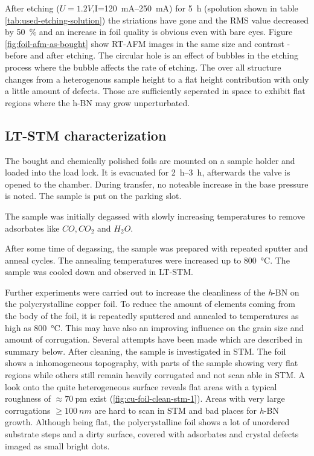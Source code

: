 	After etching ($U=1.2V$,I=\SIrange{120}{250}{\mA}) for \SI{5}{\hour} (spolution shown in table \ref{tab:used-etching-solution}) the striations have gone and the RMS value decreased by \SI{50}{\percent} and an increase in foil quality is obvious even with bare eyes. Figure \ref{fig:foil-afm-as-bought} show RT-AFM images in the same size and contrast - before  and after  etching.
	The circular hole is an effect of bubbles in the etching process where the bubble affects the rate of etching. The over all structure changes from a heterogenous sample height to a flat height contribution with only a little amount of defects. Those are sufficiently seperated in space to exhibit flat regions where the h-BN may grow unperturbated.
	
\subsection{LT-STM characterization}
\label{section:foil-STM}
The bought and chemically polished foils are mounted on a sample holder and loaded into the load lock. It is evacuated for \SIrange{2}{3}{\hour}, afterwards the valve is opened to the chamber. During transfer, no noteable increase in the base pressure is noted. The sample is put on the parking slot.
		
The sample was initially degassed with slowly increasing temperatures to remove adsorbates like $CO, CO_2$ and $H_2O$.
		
After some time of degassing, the sample was prepared with repeated sputter and anneal cycles. The annealing temperatures were increased up to \SI{800}{\degreeCelsius}. 
The sample was cooled down and observed in LT-STM.
		
Further experiments were carried out to increase the cleanliness of the \textit{h}-BN on the polycrystalline copper foil. To reduce the amount of elements coming from the body of the foil, it is repeatedly sputtered and annealed to temperatures as high as \SI{800}{\celsius}. This may have also an improving influence on the grain size and amount of corrugation. Several attempts have been made which are described in summary below.
After cleaning, the sample is investigated in STM. The foil shows a inhomogeneous topography, with parts of the sample showing very flat regions while others still remain heavily corrugated and not scan able in STM.  A look onto the quite heterogeneous surface reveals flat areas with a typical roughness of $\approx \SI{70}{\pico\meter}$ exist (\autoref{fig:cu-foil-clean-stm-1}). Areas with very large corrugations $\geq \SI{100}{nm}$ are hard to scan in STM and bad places for \textit{h}-BN growth. Although being flat, the polycrystalline foil shows a lot of unordered substrate steps and a dirty surface, covered with adsorbates and crystal defects imaged as small bright dots.

